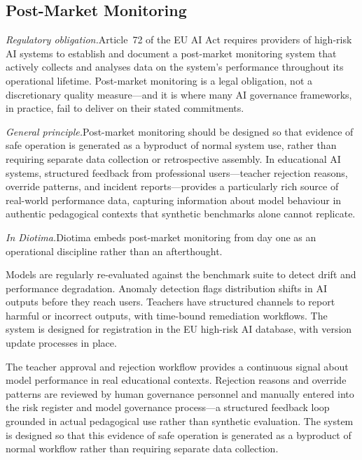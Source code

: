 \documentclass[10pt, a4paper, twocolumn]{article}
\begin{document}
\subsection{Post-Market Monitoring}
\label{sec:postmarket}

\textit{Regulatory obligation.}\quad Article~72 of the EU AI Act requires providers of
high-risk AI systems to establish and document a post-market monitoring system that
actively collects and analyses data on the system's performance throughout its
operational lifetime. Post-market monitoring is a legal obligation, not a discretionary
quality measure---and it is where many AI governance frameworks, in practice, fail to
deliver on their stated commitments.

\textit{General principle.}\quad Post-market monitoring should be designed so that
evidence of safe operation is generated as a byproduct of normal system use, rather
than requiring separate data collection or retrospective assembly. In educational AI
systems, structured feedback from professional users---teacher rejection reasons,
override patterns, and incident reports---provides a particularly rich source of
real-world performance data, capturing information about model behaviour in authentic
pedagogical contexts that synthetic benchmarks alone cannot replicate.

\textit{In Diotima.}\quad Diotima embeds post-market monitoring from day one as an
operational discipline rather than an afterthought.

Models are regularly re-evaluated against the benchmark suite to detect drift and
performance degradation. Anomaly detection flags distribution shifts in AI outputs
before they reach users. Teachers have structured channels to report harmful or
incorrect outputs, with time-bound remediation workflows. The system is designed for
registration in the EU high-risk AI database, with version update processes in place.

The teacher approval and rejection workflow provides a continuous signal about model
performance in real educational contexts. Rejection reasons and override patterns are
reviewed by human governance personnel and manually entered into the risk register and
model governance process---a structured feedback loop grounded in actual pedagogical
use rather than synthetic evaluation. The system is designed so that this evidence of
safe operation is generated as a byproduct of normal workflow rather than requiring
separate data collection.
\end{document}
